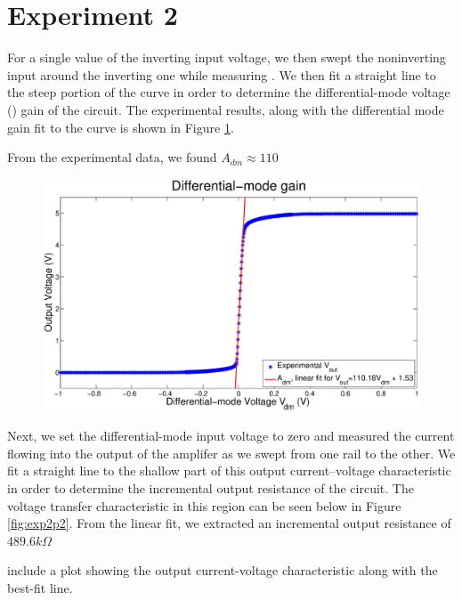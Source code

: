 \section*{Experiment 2}

For a single value of the inverting input voltage, we then swept the
noninverting input around the inverting one while measuring \Vout. We then fit
a straight line to the steep portion of the curve in order to determine the
differential-mode voltage (\Adm) gain of the circuit. The experimental results,
along with the differential mode gain fit to the curve is shown in Figure
\ref{fig:exp2p1}.

From the experimental data, we found $A_{dm} \approx 110$
\begin{figure}[H]
\centering
\includegraphics[width=\linewidth]{../Figures/Exp2P1.eps}
\caption{}
\label{fig:exp2p1}
\end{figure}

Next, we set the differential-mode input voltage to zero and measured the
current flowing into the output of the amplifer as we swept \Vout from one
rail to the other. We fit a straight line to the shallow part of this output
current–voltage characteristic in order to determine the incremental output
resistance of the circuit. The voltage transfer characteristic in this region
can be seen below in Figure \ref{fig:exp2p2}.
From the linear fit, we extracted an incremental output resistance of $489.6k\Omega$

include a plot showing the output current-voltage characteristic along with the best-fit line.




